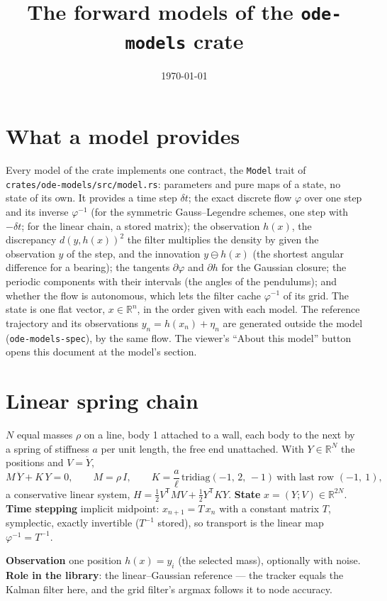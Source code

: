\documentclass[11pt,a4paper]{article}
\title{The forward models of the \texttt{ode-models} crate}
\author{}
\date{\today}
\newcommand{\T}{^{\mathsf T}}
\newcommand{\modelsection}[2]{\clearpage\hypertarget{#1}{}\section{#2}\label{model:#1}}
\begin{document}
\maketitle

\section*{What a model provides}
Every model of the crate implements one contract, the \texttt{Model} trait of \texttt{crates/ode-models/src/model.rs}: parameters and pure maps of a state, no state of its own. It provides a time step $\delta t$; the exact discrete flow $\varphi$ over one step and its inverse $\varphi^{-1}$ (for the symmetric Gauss--Legendre schemes, one step with $-\delta t$; for the linear chain, a stored matrix); the observation $h(x)$, the discrepancy $d(y,h(x))^2$ the filter multiplies the density by given the observation $y$ of the step, and the innovation $y\ominus h(x)$ (the shortest angular difference for a bearing); the tangents $\partial\varphi$ and $\partial h$ for the Gaussian closure; the periodic components with their intervals (the angles of the pendulums); and whether the flow is autonomous, which lets the filter cache $\varphi^{-1}$ of its grid. The state is one flat vector, $x\in\mathbb R^n$, in the order given with each model. The reference trajectory and its observations $y_n=h(x_n)+\eta_n$ are generated outside the model (\texttt{ode-models-spec}), by the same flow. The viewer's ``About this model'' button opens this document at the model's section.

\tableofcontents

\modelsection{spring}{Linear spring chain}
$N$ equal masses $\rho$ on a line, body 1 attached to a wall, each body to the next by a spring of stiffness $a$ per unit length, the free end unattached. With $Y\in\mathbb R^N$ the positions and $V=\dot Y$,
\[
  M\,\ddot Y + K\,Y = 0, \qquad M=\rho\,I, \qquad K=\frac a\ell\,\mathrm{tridiag}(-1,\,2,\,-1)\ \text{with last row } (-1,\ 1),
\]
a conservative linear system, $H=\tfrac12 V\T MV+\tfrac12 Y\T KY$. \textbf{State} $x=(Y;V)\in\mathbb R^{2N}$. \textbf{Time stepping} implicit midpoint: $x_{n+1}=T\,x_n$ with a constant matrix $T$, symplectic, exactly invertible ($T^{-1}$ stored), so transport is the linear map $\varphi^{-1}=T^{-1}$.

\textbf{Observation} one position $h(x)=y_i$ (the selected mass), optionally with noise. \textbf{Role in the library}: the linear--Gaussian reference — the tracker equals the Kalman filter here, and the grid filter's argmax follows it to node accuracy.
\end{document}
